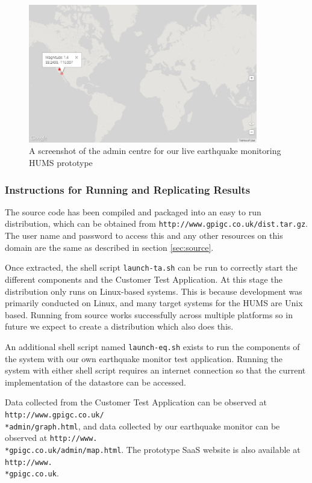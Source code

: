 \documentclass[10pt,a4paper]{article}
\begin{document}
\begin{figure}[h!]
  \centering
  \includegraphics[width=10cm]{images/plotearthquakes.png}
  \caption{A screenshot of the admin centre for our live earthquake monitoring HUMS prototype}
  \label{fig:plotearthquakes}
\end{figure}

\subsubsection{Instructions for Running and Replicating Results}
The source code has been compiled and packaged into an easy to run distribution, which can be obtained from \verb+http://www.gpigc.co.uk/dist.tar.gz+. The user name and password to access this and any other resources on this domain are the same as described in section \ref{sec:source}.

Once extracted, the shell script \verb+launch-ta.sh+ can be run to correctly start the different components and the Customer Test Application. At this stage the distribution only runs on Linux-based systems. This is because development was primarily conducted on Linux, and many target systems for the HUMS are Unix based. Running from source works successfully across multiple platforms so in future we expect to create a distribution which also does this.

An additional shell script named \verb+launch-eq.sh+ exists to run the components of the system with our own earthquake monitor test application. Running the system with either shell script requires an internet connection so that the current implementation of the datastore can be accessed.

Data collected from the Customer Test Application can be observed at \texttt{http://www.gpigc.co.uk/\\*admin/graph.html}, and data collected by our earthquake monitor can be observed at \texttt{http://www.\\*gpigc.co.uk/admin/map.html}. The prototype SaaS website is also available at  \texttt{http://www.\\*gpigc.co.uk}.
\end{document}
